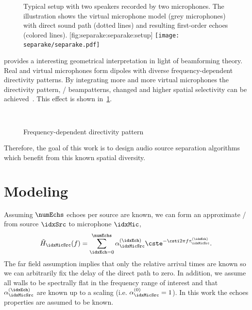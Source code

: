 \begin{figure}[t]
    \begin{sidecaption}{%
        Typical setup with two speakers recorded by two microphones.
        The illustration shows the virtual microphone model (grey microphones) with direct sound path (dotted lines) and resulting first-order echoes (colored lines).
        }[fig:separake:separake:setup]
    \centering
    \texttt{[image: separake/separake.pdf]}
    \end{sidecaption}
\end{figure}

 provides a interesting geometrical interpretation in light of beamforming theory.
Real and virtual microphones form dipoles with diverse frequency-dependent directivity patterns.
By integrating more and more virtual microphones the directivity pattern, \aka/ beampatterns, changed and higher spatial selectivity can be achieved~.
This effect is shown in~\cref{fig:separake:directivity}.
\begin{figure}[h]
    \begin{fullwidth}
    \centering
    \\
    \label{fig:separake:directivity}
    \caption{Frequency-dependent directivity pattern }
    \end{fullwidth}
\end{figure}
Therefore, the goal of this work is to design audio source separation algorithms which benefit from this known spatial diversity.

\section{Modeling}
Assuming $\numEchs$ echoes per source are known, we can form an approximate \RTF/ from source $\idxSrc$ to microphone $\idxMic$,
\begin{equation}
    \label{eq:separake:approx_tf}
    \tilde{H}_{\idxMicSrc}(f) = \sum_{\idxEch=0}^{\numEchs} \alpha_{\idxMicSrc}^{(\idxEch)} \cste^{-\csti 2 \pi f \tau_{\idxMicSrc}^{(\idxEch)}}.
\end{equation}
The far field assumption implies that only the relative arrival times are known so we can arbitrarily fix the delay of the direct path to zero.
In addition, we assume all walls to be spectrally flat in the frequency range of interest and that $\alpha_{\idxMicSrc}^{(\idxEch)}$ are known up to a scaling (i.e. $\alpha_{\idxMicSrc}^{(0)} = 1$).
In this work the echoes properties are assumed to be known.


